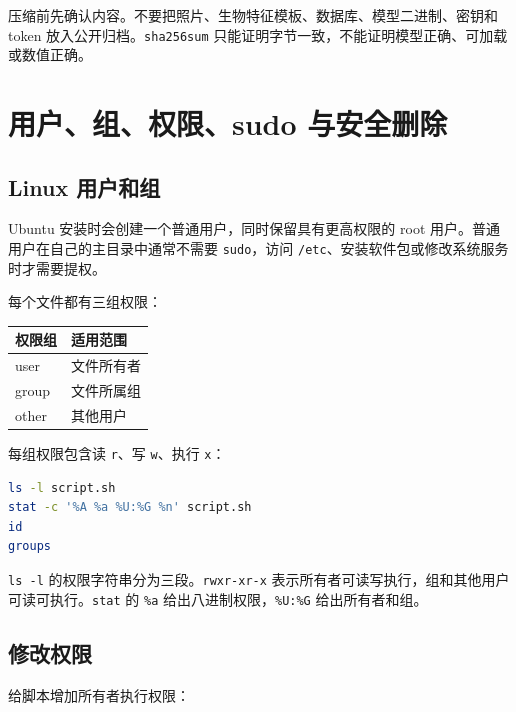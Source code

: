 压缩前先确认内容。不要把照片、生物特征模板、数据库、模型二进制、密钥和
token 放入公开归档。\passthrough{\lstinline!sha256sum!}
只能证明字节一致，不能证明模型正确、可加载或数值正确。

\section{用户、组、权限、sudo
与安全删除}\label{ux7528ux6237ux7ec4ux6743ux9650sudo-ux4e0eux5b89ux5168ux5220ux9664}

\subsection{Linux 用户和组}\label{linux-ux7528ux6237ux548cux7ec4}

Ubuntu 安装时会创建一个普通用户，同时保留具有更高权限的 root
用户。普通用户在自己的主目录中通常不需要
\passthrough{\lstinline!sudo!}，访问
\passthrough{\lstinline!/etc!}、安装软件包或修改系统服务时才需要提权。

每个文件都有三组权限：

\begin{longtable}[]{@{}ll@{}}
\toprule\noalign{}
权限组 & 适用范围 \\
\midrule\noalign{}
\endhead
\bottomrule\noalign{}
\endlastfoot
user & 文件所有者 \\
group & 文件所属组 \\
other & 其他用户 \\
\end{longtable}

每组权限包含读 \passthrough{\lstinline!r!}、写
\passthrough{\lstinline!w!}、执行 \passthrough{\lstinline!x!}：

\begin{lstlisting}[language=bash]
ls -l script.sh
stat -c '%A %a %U:%G %n' script.sh
id
groups
\end{lstlisting}

\passthrough{\lstinline!ls -l!}
的权限字符串分为三段。\passthrough{\lstinline!rwxr-xr-x!}
表示所有者可读写执行，组和其他用户可读可执行。\passthrough{\lstinline!stat!}
的 \passthrough{\lstinline!\%a!}
给出八进制权限，\passthrough{\lstinline!\%U:\%G!} 给出所有者和组。

\subsection{修改权限}\label{ux4feeux6539ux6743ux9650}

给脚本增加所有者执行权限：

